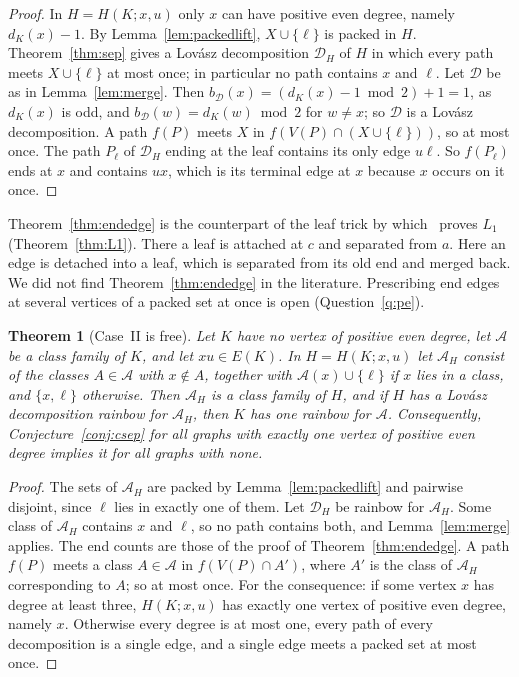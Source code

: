 \documentclass[11pt]{amsart}
\newtheorem{theorem}{Theorem}
\theoremstyle{definition}
\newcommand{\cA}{\mathcal A}
\newcommand{\cD}{\mathcal D}
\begin{document}
\begin{proof}
In $H=H(K;x,u)$ only $x$ can have positive even degree, namely $d_K(x)-1$. By
Lemma~\ref{lem:packedlift}, $X\cup\{\ell\}$ is packed in $H$. Theorem~\ref{thm:sep} gives a Lov\'asz
decomposition $\cD_H$ of $H$ in which every path meets $X\cup\{\ell\}$ at most once; in particular no
path contains $x$ and $\ell$. Let $\cD$ be as in Lemma~\ref{lem:merge}. Then
$b_\cD(x)=(d_K(x)-1\bmod2)+1=1$, as $d_K(x)$ is odd, and $b_\cD(w)=d_K(w)\bmod2$ for $w\ne x$; so $\cD$ is a
Lov\'asz decomposition. A path $f(P)$ meets $X$ in $f(V(P)\cap(X\cup\{\ell\}))$, so at most once. The
path $P_\ell$ of $\cD_H$ ending at the leaf contains its only edge $u\ell$. So $f(P_\ell)$ ends at $x$ and
contains $ux$, which is its terminal edge at $x$ because $x$ occurs on it once.
\end{proof}

Theorem~\ref{thm:endedge} is the counterpart of the leaf trick by which~\cite[Theorem~6.3]{RD} proves
$L_1$ (Theorem~\ref{thm:L1}). There a
leaf is attached at $c$ and separated from $a$. Here an edge is detached into a leaf, which is separated
from its old end and merged back. We did not find Theorem~\ref{thm:endedge} in the literature.
Prescribing end edges at several vertices of a packed set at once is open
(Question~\ref{q:pe}).

\begin{theorem}[Case~II is free]\label{thm:caseII}
Let $K$ have no vertex of positive even degree, let $\cA$ be a class family of $K$, and let $xu\in E(K)$.
In $H=H(K;x,u)$ let $\cA_H$ consist of the classes $A\in\cA$ with $x\notin A$, together with
$\cA(x)\cup\{\ell\}$ if $x$ lies in a class, and $\{x,\ell\}$ otherwise. Then $\cA_H$ is a class family
of $H$, and if $H$ has a Lov\'asz decomposition rainbow for $\cA_H$, then $K$ has one rainbow for $\cA$.
Consequently, Conjecture~\ref{conj:csep} for all graphs with exactly one vertex of positive even degree
implies it for all graphs with none.
\end{theorem}

\begin{proof}
The sets of $\cA_H$ are packed by Lemma~\ref{lem:packedlift} and pairwise disjoint, since $\ell$ lies in
exactly one of them. Let $\cD_H$ be rainbow for $\cA_H$. Some class of $\cA_H$ contains $x$ and $\ell$, so
no path contains both, and Lemma~\ref{lem:merge} applies. The end counts are those of the proof of
Theorem~\ref{thm:endedge}. A path $f(P)$ meets a class $A\in\cA$ in $f(V(P)\cap A')$, where $A'$ is the
class of $\cA_H$ corresponding to $A$; so at most once. For the consequence: if some vertex $x$ has degree
at least three, $H(K;x,u)$ has exactly one vertex of positive even degree, namely $x$. Otherwise every
degree is at most one, every path of every decomposition is a single edge, and a single edge meets a
packed set at most once.
\end{proof}
\end{document}
